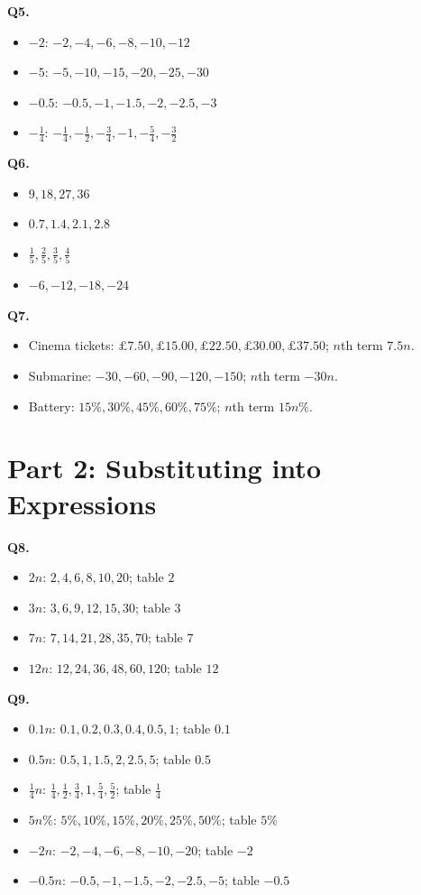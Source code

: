 \documentclass[11pt,a4paper]{article}
\begin{document}
\textbf{Q5.}
\begin{itemize}
\item \(-2\): \(-2,-4,-6,-8,-10,-12\)
\item \(-5\): \(-5,-10,-15,-20,-25,-30\)
\item \(-0.5\): \(-0.5,-1,-1.5,-2,-2.5,-3\)
\item \(-\frac14\): \(-\frac14,-\frac12,-\frac34,-1,-\frac54,-\frac32\)
\end{itemize}

\textbf{Q6.}
\begin{itemize}
\item[(a)] \(9,18,27,36\)
\item[(b)] \(0.7,1.4,2.1,2.8\)
\item[(c)] \(\frac15,\frac25,\frac35,\frac45\)
\item[(d)] \(-6,-12,-18,-24\)
\end{itemize}

\textbf{Q7.}
\begin{itemize}
\item Cinema tickets: \(\pounds7.50,\pounds15.00,\pounds22.50,\pounds30.00,\pounds37.50\); \(n\)th term \(7.5n\).
\item Submarine: \(-30,-60,-90,-120,-150\); \(n\)th term \(-30n\).
\item Battery: \(15\%,30\%,45\%,60\%,75\%\); \(n\)th term \(15n\%\).
\end{itemize}

\section*{Part 2: Substituting into Expressions}

\textbf{Q8.}
\begin{itemize}
\item \(2n\): \(2,4,6,8,10,20\); table \(2\)
\item \(3n\): \(3,6,9,12,15,30\); table \(3\)
\item \(7n\): \(7,14,21,28,35,70\); table \(7\)
\item \(12n\): \(12,24,36,48,60,120\); table \(12\)
\end{itemize}

\textbf{Q9.}
\begin{itemize}
\item \(0.1n\): \(0.1,0.2,0.3,0.4,0.5,1\); table \(0.1\)
\item \(0.5n\): \(0.5,1,1.5,2,2.5,5\); table \(0.5\)
\item \(\frac14 n\): \(\frac14,\frac12,\frac34,1,\frac54,\frac52\); table \(\frac14\)
\item \(5n\%\): \(5\%,10\%,15\%,20\%,25\%,50\%\); table \(5\%\)
\item \(-2n\): \(-2,-4,-6,-8,-10,-20\); table \(-2\)
\item \(-0.5n\): \(-0.5,-1,-1.5,-2,-2.5,-5\); table \(-0.5\)
\end{itemize}
\end{document}
